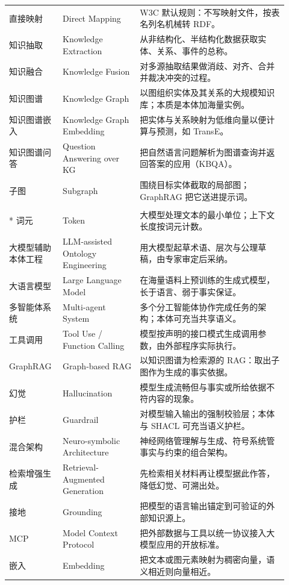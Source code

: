 \begin{longtable}{@{}p{0.16\linewidth}p{0.26\linewidth}p{0.5\linewidth}@{}}
直接映射 & Direct Mapping & W3C 默认规则：不写映射文件，按表名列名机械转 RDF。 \\
知识抽取 & Knowledge Extraction & 从非结构化、半结构化数据获取实体、关系、事件的总称。 \\
知识融合 & Knowledge Fusion & 对多源抽取结果做消歧、对齐、合并并裁决冲突的过程。 \\
知识图谱 & Knowledge Graph & 以图组织实体及其关系的大规模知识库；本质是本体加海量实例。 \\
知识图谱嵌入 & Knowledge Graph Embedding & 把实体与关系映射为低维向量以便计算与预测，如 TransE。 \\
知识图谱问答 & Question Answering over KG & 把自然语言问题解析为图谱查询并返回答案的应用（KBQA）。 \\
子图 & Subgraph & 围绕目标实体截取的局部图；GraphRAG 把它送进提示词。 \\
\addlinespace[10pt]
\multicolumn{3}{@{}l}{\textbf{——本体与大语言模型——}} \\*
\addlinespace[3pt]
词元 & Token & 大模型处理文本的最小单位；上下文长度按词元计数。 \\
大模型辅助本体工程 & LLM-assisted Ontology Engineering & 用大模型起草术语、层次与公理草稿，由专家审定后采纳。 \\
大语言模型 & Large Language Model & 在海量语料上预训练的生成式模型，长于语言、弱于事实保证。 \\
多智能体系统 & Multi-agent System & 多个分工智能体协作完成任务的架构；本体可充当共享语义。 \\
工具调用 & Tool Use / Function Calling & 模型按声明的接口模式生成调用参数，由外部程序实际执行。 \\
GraphRAG & Graph-based RAG & 以知识图谱为检索源的 RAG：取出子图作为生成的事实依据。 \\
幻觉 & Hallucination & 模型生成流畅但与事实或所给依据不符内容的现象。 \\
护栏 & Guardrail & 对模型输入输出的强制校验层；本体与 SHACL 可充当语义护栏。 \\
混合架构 & Neuro-symbolic Architecture & 神经网络管理解与生成、符号系统管事实与约束的组合架构。 \\
检索增强生成 & Retrieval-Augmented Generation & 先检索相关材料再让模型据此作答，降低幻觉、可溯出处。 \\
接地 & Grounding & 把模型的语言输出锚定到可验证的外部知识源上。 \\
MCP & Model Context Protocol & 把外部数据与工具以统一协议接入大模型应用的开放标准。 \\
嵌入 & Embedding & 把文本或图元素映射为稠密向量，语义相近则向量相近。 \\

\end{longtable}
